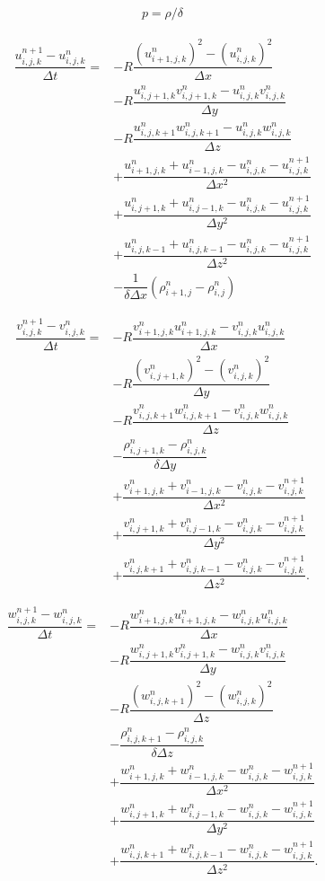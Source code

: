 \documentclass{article}
\begin{document}
\[
\begin{aligned}
    p = \rho/\delta
\end{aligned}
\]

\[
\begin{aligned}
    \dfrac{u_{i,j,k}^{n+1} - u_{i,j,k}^{n}}{\Delta t} = & - R \dfrac{(u_{i+1,j,k}^n)^2 - (u_{i,j,k}^n)^2}{\Delta x} \\
    & - R \dfrac{u_{i,j+1,k}^n v_{i,j+1,k}^n - u_{i,j,k}^n v_{i,j,k}^n}{\Delta y} \\
    & - R \dfrac{u_{i,j,k+1}^n w_{i,j,k+1}^n - u_{i,j,k}^n w_{i,j,k}^n}{\Delta z} \\
    & + \dfrac{u_{i+1,j,k}^n + u_{i-1,j,k}^n - u_{i,j,k}^n - u_{i,j,k}^{n+1}}{\Delta x^2} \\
    & + \dfrac{u_{i,j+1,k}^n + u_{i,j-1,k}^n - u_{i,j,k}^n - u_{i,j,k}^{n+1}}{\Delta y^2} \\
    & + \dfrac{u_{i,j,k-1}^n + u_{i,j,k-1}^n - u_{i,j,k}^n - u_{i,j,k}^{n+1}}{\Delta z^2} \\
    & - \dfrac{1}{\delta \Delta x}(\rho_{i+1,j}^n - \rho_{i,j}^n)
\end{aligned}
\]

\[
\begin{aligned}
    \dfrac{v_{i,j,k}^{n+1} - v_{i,j,k}^n}{\Delta t} = & - R \dfrac{v_{i+1,j,k}^n u_{i+1,j,k}^n - v_{i,j,k}^n u_{i,j,k}^n}{\Delta x} \\
    & - R \dfrac{(v_{i,j+1,k}^n)^2 - (v_{i,j,k}^n)^2}{\Delta y} \\
    & - R \dfrac{v_{i,j,k+1}^n w_{i,j,k+1}^n - v_{i,j,k}^n w_{i,j,k}^n}{\Delta z} \\
    & -\dfrac{\rho_{i,j+1,k}^n - \rho_{i,j,k}^n}{\delta \Delta y} \\
    & + \dfrac{v_{i+1,j,k}^n + v_{i-1,j,k}^n - v_{i,j,k}^n - v_{i,j,k}^{n+1}}{\Delta x^2} \\
    & + \dfrac{v_{i,j+1,k}^n + v_{i,j-1,k}^n - v_{i,j,k}^n - v_{i,j,k}^{n+1}}{\Delta y^2} \\
    & + \dfrac{v_{i,j,k+1}^n + v_{i,j,k-1}^n - v_{i,j,k}^n - v_{i,j,k}^{n+1}}{\Delta z^2}.
\end{aligned}
\]


\[
\begin{aligned}
    \dfrac{w_{i,j,k}^{n+1} - w_{i,j,k}^n}{\Delta t} = & - R \dfrac{w_{i+1,j,k}^n u_{i+1,j,k}^n - w_{i,j,k}^n u_{i,j,k}^n}{\Delta x} \\
	& - R \dfrac{w_{i,j+1,k}^n v_{i,j+1,k}^n - w_{i,j,k}^n v_{i,j,k}^n}{\Delta y} \\
    & - R \dfrac{(w_{i,j,k+1}^n)^2 - (w_{i,j,k}^n)^2}{\Delta z} \\
	& - \dfrac{\rho_{i,j,k+1}^n - \rho_{i,j,k}^n}{\delta \Delta z} \\
    & + \dfrac{w_{i+1,j,k}^n + w_{i-1,j,k}^n - w_{i,j,k}^n - w_{i,j,k}^{n+1}}{\Delta x^2} \\
	& + \dfrac{w_{i,j+1,k}^n + w_{i,j-1,k}^n - w_{i,j,k}^n - w_{i,j,k}^{n+1}}{\Delta y^2} \\
    & + \dfrac{w_{i,j,k+1}^n + w_{i,j,k-1}^n - w_{i,j,k}^n - w_{i,j,k}^{n+1}}{\Delta z^2}.
\end{aligned}
\]
\end{document}
